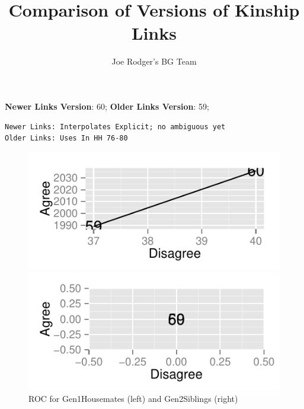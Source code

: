 \documentclass[a4paper]{article}\usepackage{graphicx, color}
\title{Comparison of Versions of Kinship Links}
\author{Joe Rodger's BG Team}
\makeatletter
\def\maxwidth{ %
  \ifdim\Gin@nat@width>\linewidth
    \linewidth
  \else
    \Gin@nat@width
  \fi
}
\newenvironment{kframe}{%
 \def\at@end@of@kframe{}%
 \ifinner\ifhmode%
  \def\at@end@of@kframe{\end{minipage}}%
  \begin{minipage}{\columnwidth}%
 \fi\fi%
 \def\FrameCommand##1{\hskip\@totalleftmargin \hskip-\fboxsep
 \colorbox{shadecolor}{##1}\hskip-\fboxsep
     \hskip-\linewidth \hskip-\@totalleftmargin \hskip\columnwidth}%
 \MakeFramed {\advance\hsize-\width
   \@totalleftmargin\z@ \linewidth\hsize
   \@setminipage}}%
 {\par\unskip\endMakeFramed%
 \at@end@of@kframe}
\newenvironment{knitrout}{}{} %
\makeatother
\begin{document}
\maketitle

\setlength{\parindent}{0pt}%







\textbf{Newer Links Version}: 60;
\textbf{Older Links Version}: 59;

\begin{knitrout}
\color{fgcolor}\begin{kframe}
\begin{verbatim}
Newer Links: Interpolates Explicit; no ambiguous yet
Older Links: Uses In HH 76-80
\end{verbatim}
\end{kframe}
\end{knitrout}


\begin{figure}[htbp]
\begin{knitrout}
\color{fgcolor}
\includegraphics[width=\maxwidth]{figure/unnamed-chunk-31} 

\includegraphics[width=\maxwidth]{figure/unnamed-chunk-32} 

\end{knitrout}

\caption{ROC for Gen1Housemates (left) and Gen2Siblings (right)}
\end{figure}
\end{document}
